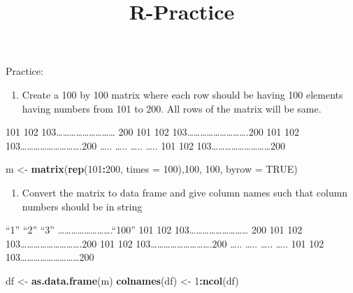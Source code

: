 \documentclass[]{article}
\title{R-Practice}
\author{}
\date{}
\newenvironment{Shaded}{\begin{snugshade}}{\end{snugshade}}
\newcommand{\DataTypeTok}[1]{\textcolor[rgb]{0.13,0.29,0.53}{#1}}
\newcommand{\DecValTok}[1]{\textcolor[rgb]{0.00,0.00,0.81}{#1}}
\newcommand{\KeywordTok}[1]{\textcolor[rgb]{0.13,0.29,0.53}{\textbf{#1}}}
\newcommand{\NormalTok}[1]{#1}
\newcommand{\OperatorTok}[1]{\textcolor[rgb]{0.81,0.36,0.00}{\textbf{#1}}}
\newcommand{\OtherTok}[1]{\textcolor[rgb]{0.56,0.35,0.01}{#1}}
\newcommand{\StringTok}[1]{\textcolor[rgb]{0.31,0.60,0.02}{#1}}
\providecommand{\tightlist}{%
  \setlength{\itemsep}{0pt}\setlength{\parskip}{0pt}}
\begin{document}
\maketitle

Practice:

\begin{enumerate}
\def\labelenumi{\arabic{enumi}.}
\tightlist
\item
  Create a 100 by 100 matrix where each row should be having 100
  elements having numbers from 101 to 200. All rows of the matrix will
  be same.
\end{enumerate}

101 102
103\ldots{}\ldots{}\ldots{}\ldots{}\ldots{}\ldots{}\ldots{}\ldots{}\ldots{}
200 101 102
103\ldots{}\ldots{}\ldots{}\ldots{}\ldots{}\ldots{}\ldots{}\ldots{}\ldots{}.200
101 102
103\ldots{}\ldots{}\ldots{}\ldots{}\ldots{}\ldots{}\ldots{}\ldots{}\ldots{}.200
\ldots{}.. \ldots{}.. \ldots{}.. \ldots{}.. 101 102
103\ldots{}\ldots{}\ldots{}\ldots{}\ldots{}\ldots{}\ldots{}\ldots{}\ldots{}200

\begin{Shaded}
\begin{Highlighting}[]
\NormalTok{m <-}\StringTok{ }\KeywordTok{matrix}\NormalTok{(}\KeywordTok{rep}\NormalTok{(}\DecValTok{101}\OperatorTok{:}\DecValTok{200}\NormalTok{, }\DataTypeTok{times =} \DecValTok{100}\NormalTok{),}\DecValTok{100}\NormalTok{, }\DecValTok{100}\NormalTok{, }\DataTypeTok{byrow =} \OtherTok{TRUE}\NormalTok{)}
\end{Highlighting}
\end{Shaded}

\begin{enumerate}
\def\labelenumi{\arabic{enumi}.}
\setcounter{enumi}{1}
\tightlist
\item
  Convert the matrix to data frame and give column names such that
  column numbers should be in string
\end{enumerate}

``1'' ``2'' ``3''
\ldots{}\ldots{}\ldots{}\ldots{}\ldots{}\ldots{}\ldots{}\ldots{}.``100''
101 102
103\ldots{}\ldots{}\ldots{}\ldots{}\ldots{}\ldots{}\ldots{}\ldots{}\ldots{}
200 101 102
103\ldots{}\ldots{}\ldots{}\ldots{}\ldots{}\ldots{}\ldots{}\ldots{}\ldots{}.200
101 102
103\ldots{}\ldots{}\ldots{}\ldots{}\ldots{}\ldots{}\ldots{}\ldots{}\ldots{}.200
\ldots{}.. \ldots{}.. \ldots{}.. \ldots{}.. 101 102
103\ldots{}\ldots{}\ldots{}\ldots{}\ldots{}\ldots{}\ldots{}\ldots{}\ldots{}200

\begin{Shaded}
\begin{Highlighting}[]
\NormalTok{df <-}\StringTok{ }\KeywordTok{as.data.frame}\NormalTok{(m)}
\KeywordTok{colnames}\NormalTok{(df) <-}\StringTok{ }\DecValTok{1}\OperatorTok{:}\KeywordTok{ncol}\NormalTok{(df)}
\end{Highlighting}
\end{Shaded}
\end{document}
